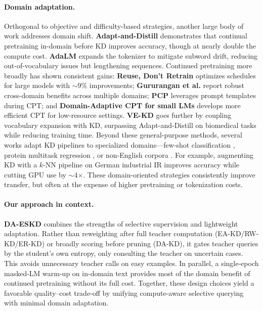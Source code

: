 \paragraph{Domain adaptation.}
Orthogonal to objective and difficulty-based strategies, another large body of work addresses domain shift. \textbf{Adapt-and-Distill} \cite{adaptanddistill} demonstrates that continual pretraining in-domain before KD improves accuracy, though at nearly double the compute cost. \textbf{AdaLM} expands the tokenizer to mitigate subword drift, reducing out-of-vocabulary issues but lengthening sequences. Continued pretraining more broadly has shown consistent gains: \textbf{Reuse, Don’t Retrain} \cite{reuse2024} optimizes schedules for large models with $\sim$9\% improvements; \textbf{Gururangan et al.} \cite{gururangan2020don} report robust cross-domain benefits across multiple domains; \textbf{PCP} \cite{pcp2023} leverages prompt templates during CPT; and \textbf{Domain-Adaptive CPT for small LMs} \cite{domainadaptive2025} develops more efficient CPT for low-resource settings. \textbf{VE-KD} \cite{vekd2024} goes further by coupling vocabulary expansion with KD, surpassing Adapt-and-Distill on biomedical tasks while reducing training time. Beyond these general-purpose methods, several works adapt KD pipelines to specialized domains—few-shot classification \cite{adasent2023}, protein multitask regression \cite{selfprot2024}, or non-English corpora \cite{germanprocess2023}. For example, augmenting KD with a $k$-NN pipeline on German industrial IR improves accuracy while cutting GPU use by $\sim$4$\times$. These domain-oriented strategies consistently improve transfer, but often at the expense of higher pretraining or tokenization costs.

\paragraph{Our approach in context.}
\textbf{DA-ESKD} combines the strengths of selective supervision and lightweight adaptation. Rather than reweighting after full teacher computation (EA-KD/RW-KD/ER-KD) or broadly scoring before pruning (DA-KD), it gates teacher queries by the student’s own entropy, only consulting the teacher on uncertain cases. This avoids unnecessary teacher calls on easy examples. In parallel, a single-epoch masked-LM warm-up on in-domain text provides most of the domain benefit of continued pretraining without its full cost. Together, these design choices yield a favorable quality--cost trade-off by unifying compute-aware selective querying with minimal domain adaptation.
